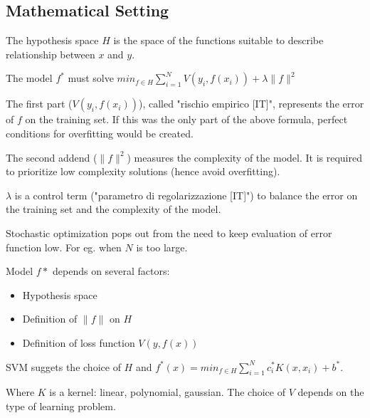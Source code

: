 \subsection{Mathematical Setting}
The hypothesis space $H$ is the space of the functions suitable to describe relationship between $x$ and $y$.

The model $f^*$ must solve $min_{f \in H} \sum_{i=1}^N V(y_i, f(x_i)) + \lambda \|f\|^2$

The first part ($V(y_i, f(x_i))$), called "rischio empirico [IT]", represents the error of $f$ on the training set. If this was the only part of the above formula, perfect conditions for overfitting would be created.

The second addend ($\|f\|^2$) measures the complexity of the model. It is required to prioritize low complexity solutions (hence avoid overfitting).

$\lambda$ is a control term ("parametro di regolarizzazione [IT]") to balance the error on the training set and the complexity of the model.

Stochastic optimization pops out from the need to keep evaluation of error function low. For eg. when $N$ is too large.

Model $f*$ depends on several factors:
\begin{itemize}
  \item Hypothesis space
  \item Definition of $\|f\|$ on $H$
  \item Definition of loss function $V(y, f(x))$
\end{itemize}

SVM suggets the choice of $H$ and $f^*(x) = min_{f \in H} \sum_{i=1}^N c_i^* K(x, x_i) + b^*$.

Where $K$ is a kernel: linear, polynomial, gaussian. The choice of $V$ depends on the type of learning problem.